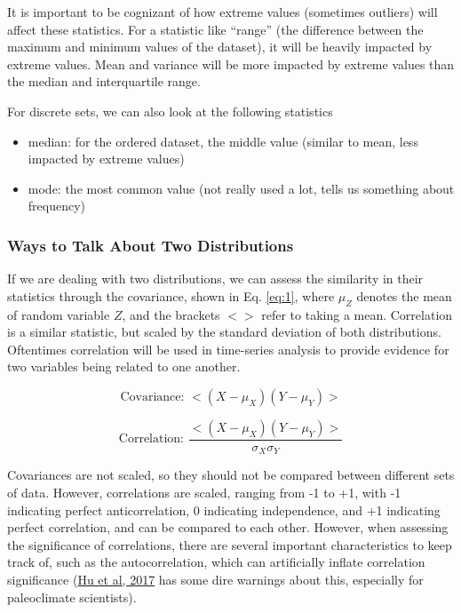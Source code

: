 \documentclass{article}
\begin{document}
It is important to be cognizant of how extreme values (sometimes outliers) will affect these statistics. For a statistic like ``range'' (the difference between the maximum and minimum values of the dataset), it will be heavily impacted by extreme values. Mean and variance will be more impacted by extreme values than the median and interquartile range. 

For discrete sets, we can also look at the following statistics
\begin{itemize}
\item median: for the ordered dataset, the middle value (similar to mean, less impacted by extreme values)
\item mode: the most common value (not really used a lot, tells us something about frequency)
\end{itemize}

\subsubsection{Ways to Talk About Two Distributions}
If we are dealing with two distributions, we can assess the similarity in their statistics through the covariance, shown in Eq. \ref{eq:1}, where $\mu_Z$ denotes the mean of random variable $Z$, and the brackets $<>$ refer to taking a mean. Correlation is a similar statistic, but scaled by the standard deviation of both distributions. Oftentimes correlation will be used in time-series analysis to provide evidence for two variables being related to one another. 

\begin{equation}
\label{eq:1}
\text{Covariance: } <\left(X - \mu_X \right) \left( Y - \mu_Y \right) >
\end{equation}


\begin{equation}
\label{eq:4}
\text{Correlation: } \frac{ <\left(X - \mu_X \right) \left( Y - \mu_Y \right) >}{\sigma_X\sigma_Y}
\end{equation}

Covariances are not scaled, so they should not be compared between different sets of data. However, correlations are scaled, ranging from -1 to +1, with -1 indicating perfect anticorrelation, 0 indicating independence, and +1 indicating perfect correlation, and can be compared to each other. However, when assessing the significance of correlations, there are several important characteristics to keep track of, such as the autocorrelation, which can artificially inflate correlation significance (\href{https://www.sciencedirect.com/science/article/pii/S0012821X16306823#!}{Hu et al, 2017} has some dire warnings about this, especially for paleoclimate scientists).
\end{document}
